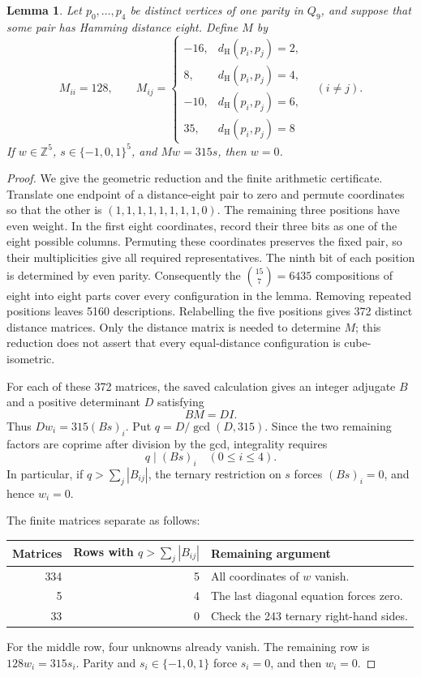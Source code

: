 \documentclass[11pt,a4paper]{article}
\newtheorem{lemma}[theorem]{Lemma}
\theoremstyle{definition}
\theoremstyle{remark}
\newcommand{\Ham}{d_{\mathrm H}}
\begin{document}
\begin{lemma}\label{lem:five-matrix240}
Let $p_0,\ldots,p_4$ be distinct vertices of one parity in $Q_9$,
and suppose that some pair has Hamming distance eight. Define $M$ by
\[
M_{ii}=128,\qquad
M_{ij}=\begin{cases}
-16,&\Ham(p_i,p_j)=2,\\
8,&\Ham(p_i,p_j)=4,\\
-10,&\Ham(p_i,p_j)=6,\\
35,&\Ham(p_i,p_j)=8
\end{cases}\quad(i\ne j).
\]
If $w\in\mathbb Z^5$, $s\in\{-1,0,1\}^5$, and $Mw=315s$, then $w=0$.
\end{lemma}
\begin{proof}
We give the geometric reduction and the finite arithmetic certificate.
Translate one endpoint of a distance-eight pair to zero and permute
coordinates so that the other is $(1,1,1,1,1,1,1,1,0)$. The remaining
three positions have even weight. In the first eight coordinates,
record their three bits as one of the eight possible columns. Permuting
these coordinates preserves the fixed pair, so their multiplicities
give all required representatives. The ninth bit of each position is
determined by even parity. Consequently the $\binom{15}{7}=6435$
compositions of eight into eight parts cover every configuration in
the lemma. Removing repeated positions leaves 5160 descriptions.
Relabelling the five positions gives 372 distinct distance matrices.
Only the distance matrix is needed to determine $M$; this reduction
does not assert that every equal-distance configuration is cube-isometric.

For each of these 372 matrices, the saved calculation gives an integer
adjugate $B$ and a positive determinant $D$ satisfying
\[
BM=DI.
\]
Thus $Dw_i=315(Bs)_i$. Put $q=D/\gcd(D,315)$. Since the two remaining
factors are coprime after division by the gcd, integrality requires
\[
q\mid(Bs)_i\quad(0\le i\le4).
\]
In particular, if $q>\sum_j|B_{ij}|$, the ternary restriction on $s$
forces $(Bs)_i=0$, and hence $w_i=0$.

The finite matrices separate as follows:
\begin{center}
\begin{tabular}{rrl}
\toprule
Matrices & Rows with $q>\sum_j|B_{ij}|$ & Remaining argument\\
\midrule
334 & 5 & All coordinates of $w$ vanish.\\
5 & 4 & The last diagonal equation forces zero.\\
33 & 0 & Check the 243 ternary right-hand sides.\\
\bottomrule
\end{tabular}
\end{center}
For the middle row, four unknowns already vanish. The remaining row is
$128w_i=315s_i$. Parity and $s_i\in\{-1,0,1\}$ force $s_i=0$, and then
$w_i=0$.


\end{proof}
\end{document}
